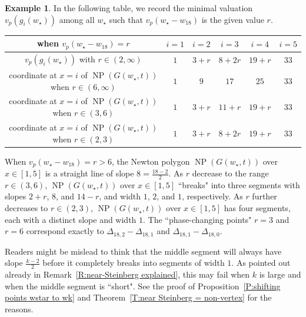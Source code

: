 \documentclass[12pt]{amsart}
\theoremstyle{definition}
\newtheorem{example}[subsection]{Example}
\numberwithin{equation}{subsection}
\DeclareMathOperator{\NP}{NP}
\begin{document}
\begin{example}
In the following table, we record the minimal valuation $v_p(g_i(w_\star))$ among all $w_\star$ such that $v_p(w_\star -w_{18})$ is the given value $r$.\begin{center}\renewcommand{\arraystretch}{1.2}\begin{tabular}{|c|c|c|c|c|c|}
\hline
when $v_p(w_\star -w_{18}) =r$ & $i=1$ & $i=2$ & $i=3$ & $i=4$ & $i=5$\\
\hline
$v_p(g_i(w_\star))$ with $r \in (2,\infty)$ & $1$ & $3+r$ & $8+2r$ & $19+r$ & $33$
\\ \hline
coordinate at $x=i$ of
$\NP(G(w_\star, t))$ when $r\in(6,\infty)$ & $1$ & $9$ & $17$ & $25$ & $33$
\\ \hline  
coordinate at $x=i$ of
$\NP(G(w_\star, t))$ when $r\in(3,6)$ & $1$ & $3+r$ & $11+r$ & $19+r$ & $33$
\\ \hline  
coordinate at $x=i$ of
$\NP(G(w_\star, t))$ when $r\in(2,3)$ & $1$ & $3+r$ & $8+2r$ & $19+r$ & $33$
\\
\hline
\end{tabular}
\end{center}
When $v_p(w_\star -w_{18}) = r > 6$, the Newton polygon  $\NP(G(w_\star, t))$ over $x \in[1,5]$ is a straight line of slope $8 = \frac{18-2}2$.  As $r$ decrease to the range $r \in (3,6)$, $\NP(G(w_\star, t))$ over $x \in[1,5]$ ``breaks" into three segments with slopes $2+r$, $8$, and $14-r$, and width $1$, $2$, and $1$, respectively. As $r$ further decreases to $r \in (2,3)$, $\NP(G(w_\star, t))$ over $x \in[1,5]$ has four segments, each with a distinct slope and width $1$.
The ``phase-changing points" $r =3$ and $r=6$ correspond exactly to $\Delta_{18, 2}-\Delta_{18,1}$ and $\Delta_{18,1} -\Delta_{18,0}$.

Readers might be mislead to think that the middle segment will always have slope $\frac{k-2}2$ before it completely breaks into segments of width $1$. As pointed out already in Remark~\ref{R:near-Steinberg explained}, this may fail when $k$ is large and when the middle segment is ``short".  See the proof of Proposition~\ref{P:shifting points wstar to wk} and Theorem~\ref{T:near Steinberg = non-vertex} for the reasons.
\end{example}
\end{document}
